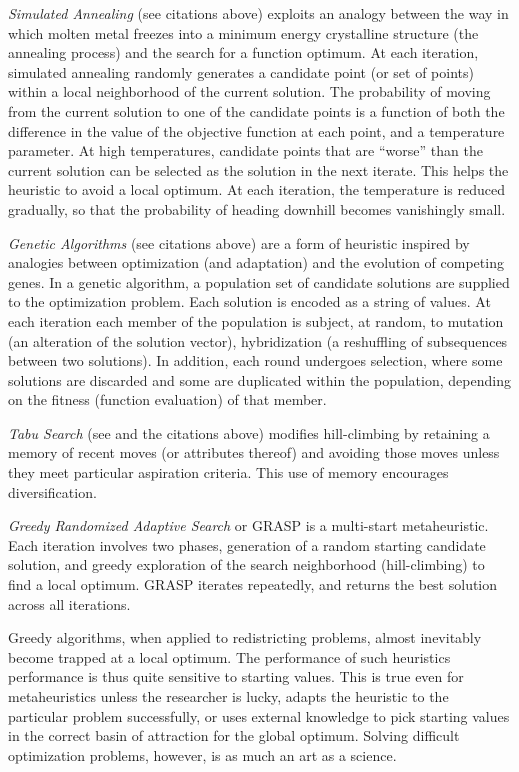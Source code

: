 \documentclass[article]{JSSstyle/jss}
\begin{document}
\emph{Simulated Annealing} (see citations above) exploits an analogy between the
way in which molten metal freezes into a minimum energy
crystalline structure (the annealing process) and the search for a
function optimum.  At each iteration, simulated annealing randomly generates
a candidate point (or set of points) within a local neighborhood
of the current solution. The probability of moving from the
current solution to one of the candidate points is a function of both
the difference in the value of the objective function at each point, and a 
temperature parameter. At high temperatures, candidate points that are ``worse'' than 
the current solution can be selected as the solution in the next iterate.  This helps the 
heuristic to avoid a local optimum. At each iteration, the temperature is reduced gradually, so 
that the probability of heading downhill becomes vanishingly small.

\emph{Genetic Algorithms} (see citations above) are a form of heuristic inspired by analogies 
between optimization (and adaptation) and the evolution of competing
genes.  In a genetic algorithm, a population set of candidate solutions are supplied to the optimization problem. 
Each solution is encoded as a string of values. At each iteration each member of the population is subject, at random, 
to mutation (an alteration of the solution vector), hybridization (a reshuffling of subsequences between two solutions). 
In addition, each round undergoes selection, where some solutions are discarded and some are 
duplicated within the population, depending on the fitness (function evaluation) of that member.

\emph{Tabu Search} (see \citet{Glover86} and the citations above) modifies hill-climbing by retaining a memory of recent moves (or attributes thereof) and avoiding those moves unless they meet particular aspiration criteria. This use of memory encourages diversification.

\emph{Greedy Randomized Adaptive Search} or GRASP \citep{FeoRes89} is a multi-start metaheuristic. Each iteration 
involves two phases, generation of a random starting candidate solution, and greedy exploration of 
the search neighborhood (hill-climbing) to find a local optimum. GRASP iterates repeatedly, and 
returns the best solution across all iterations. 

Greedy algorithms, when applied to redistricting problems, almost inevitably become trapped at a local optimum. The performance of such heuristics 
performance is thus quite sensitive to starting values. This is true even for 
metaheuristics unless the researcher is lucky, adapts the heuristic to the particular problem successfully, or uses external knowledge to pick starting values in the correct basin of attraction for the global optimum. Solving difficult optimization problems, however, is as much an art as a science.   
\end{document}
